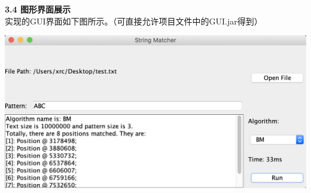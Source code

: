 \documentclass[a4paper]{article}
\begin{document}
\begin{enumerate}
  \textbf{3.4 图形界面展示}\\
  实现的GUI界面如下图所示。（可直接允许项目文件中的GUI.jar得到）
  \begin{center}
    \includegraphics[scale=0.4]{Pictures/gui.png}
  \end{center}
\end{enumerate}
\end{document}
